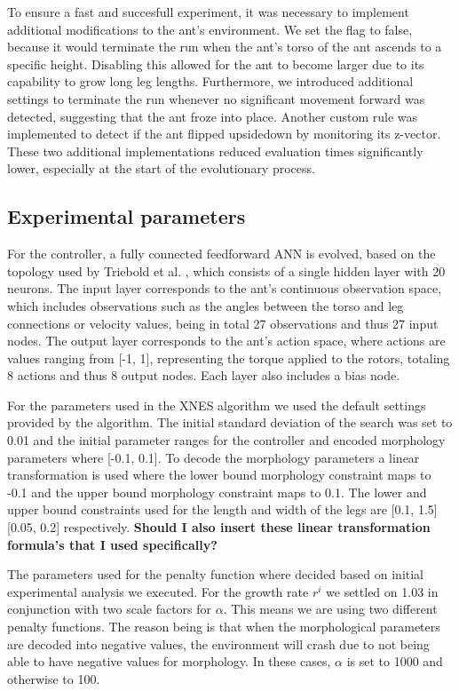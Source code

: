         To ensure a fast and succesfull experiment, it was necessary to implement additional modifications to the ant's environment. We set the  flag to false, because it would terminate the run when the ant's torso of the ant ascends to a specific height. Disabling this allowed for the ant to become larger due to its capability to grow long leg lengths. Furthermore, we introduced additional settings to terminate the run whenever no significant movement forward was detected, suggesting that the ant froze into place. Another custom rule was implemented to detect if the ant flipped upsidedown by monitoring its z-vector. These two additional implementations reduced evaluation times significantly lower, especially at the start of the evolutionary process. 

    \subsection{Experimental parameters}
        For the controller, a fully connected feedforward ANN is evolved, based on the topology used by Triebold et al. \cite{Corinna_Triebold}, which consists of a single hidden layer with 20 neurons. The input layer corresponds to the ant's continuous observation space, which includes observations such as the angles between the torso and leg connections or velocity values, being in total 27 observations and thus 27 input nodes. The output layer corresponds to the ant's action space, where actions are values ranging from [-1, 1], representing the torque applied to the rotors, totaling 8 actions and thus 8 output nodes. Each layer also includes a bias node.
        
        For the parameters used in the XNES algorithm we used the default settings provided by the algorithm. The initial standard deviation of the search was set to 0.01 and the initial parameter ranges for the controller and encoded morphology parameters where [-0.1, 0.1]. To decode the morphology parameters a linear transformation is used where the lower bound morphology constraint maps to -0.1 and the upper bound morphology constraint maps to 0.1. The lower and upper bound constraints used for the length and width of the legs are [0.1, 1.5] [0.05, 0.2] respectively. \textbf{Should I also insert these linear transformation formula's that I used specifically?}
        
        The parameters used for the penalty function where decided based on initial experimental analysis we executed. For the growth rate $r^i$ we settled on 1.03 in conjunction with two scale factors for $\alpha$. This means we are using two different penalty functions. The reason being is that when the morphological parameters are decoded into negative values, the environment will crash due to not being able to have negative values for morphology. In these cases, $\alpha$ is set to 1000 and otherwise to 100.
        
